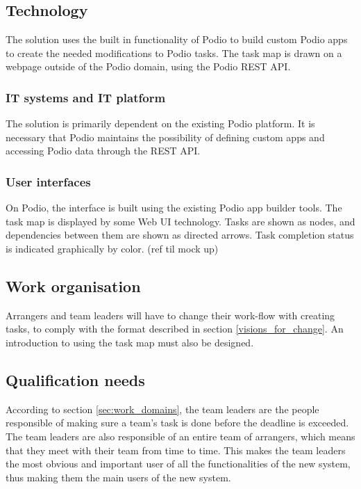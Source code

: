 \subsection{Technology}
\label{sub:technology}
The solution uses the built in functionality of Podio to build custom Podio apps to create the needed modifications to Podio tasks. The task map is drawn on a webpage outside of the Podio domain, using the Podio REST API.

\subsubsection{IT systems and IT platform}

The solution is primarily dependent on the existing Podio platform. It is necessary that Podio maintains the possibility of defining custom apps and accessing Podio data through the REST API.

\subsubsection{User interfaces}
On Podio, the interface is built using the existing Podio app builder tools. The task map is displayed by some Web UI technology. Tasks are shown as nodes, and dependencies between them are shown as directed arrows. Task completion status is indicated graphically by color. (ref til mock up)

\subsection{Work organisation}
\label{sub:work_organisation}
Arrangers and team leaders will have to change their work-flow with creating tasks, to comply with the format described in section \ref{visions_for_change}. An introduction to using the task map must also be designed.

\subsection{Qualification needs}
\label{sub:qualification_needs}
According to section \ref{sec:work_domains}, the team leaders are the people responsible of making
sure a team's task is done before the deadline is exceeded. The team leaders are also responsible
of an entire team of arrangers, which means that they meet with their team from time to time. This
makes the team leaders the most obvious and important user of all the functionalities of the new
system, thus making them the main users of the new system. 

